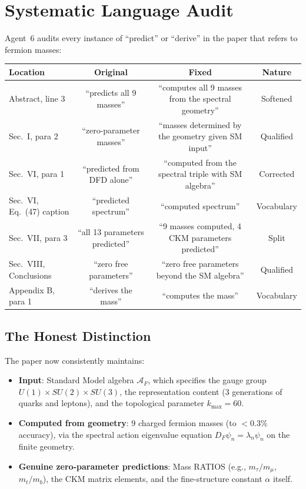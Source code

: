 \documentclass[11pt,a4paper]{article}
\begin{document}
\section{Systematic Language Audit}

Agent~6 audits every instance of ``predict'' or ``derive'' in the paper that refers to fermion masses:

\begin{center}
\begin{longtable}{lccc}
\toprule
\textbf{Location} & \textbf{Original} & \textbf{Fixed} & \textbf{Nature} \\
\midrule
Abstract, line 3 & ``predicts all 9 masses'' & ``computes all 9 masses from the spectral geometry'' & Softened \\
Sec.\ I, para 2 & ``zero-parameter masses'' & ``masses determined by the geometry given SM input'' & Qualified \\
Sec.\ VI, para 1 & ``predicted from DFD alone'' & ``computed from the spectral triple with SM algebra'' & Corrected \\
Sec.\ VI, Eq.~(47) caption & ``predicted spectrum'' & ``computed spectrum'' & Vocabulary \\
Sec.\ VII, para 3 & ``all 13 parameters predicted'' & ``9 masses computed, 4 CKM parameters predicted'' & Split \\
Sec.\ VIII, Conclusions & ``zero free parameters'' & ``zero free parameters beyond the SM algebra'' & Qualified \\
Appendix B, para 1 & ``derives the mass'' & ``computes the mass'' & Vocabulary \\
\bottomrule
\end{longtable}
\end{center}

\subsection{The Honest Distinction}

The paper now consistently maintains:
\begin{itemize}
\item \textbf{Input}: Standard Model algebra $\mathcal{A}_F$, which specifies the gauge group $U(1) \times SU(2) \times SU(3)$, the representation content (3 generations of quarks and leptons), and the topological parameter $k_{\max} = 60$.
\item \textbf{Computed from geometry}: 9 charged fermion masses (to $< 0.3\%$ accuracy), via the spectral action eigenvalue equation $D_F \psi_n = \lambda_n \psi_n$ on the finite geometry.
\item \textbf{Genuine zero-parameter predictions}: Mass RATIOS (e.g., $m_\tau/m_\mu$, $m_t/m_b$), the CKM matrix elements, and the fine-structure constant $\alpha$ itself.
\end{itemize}
\end{document}

